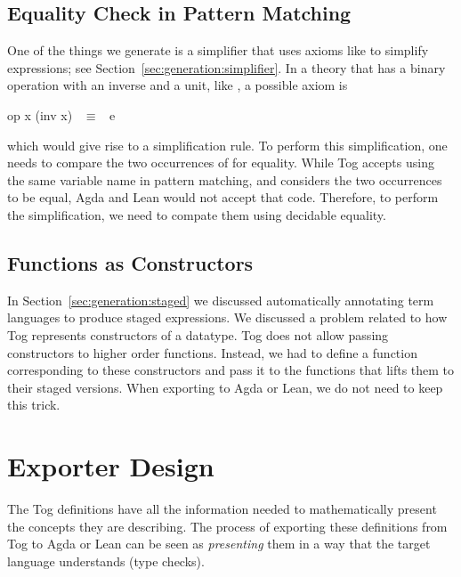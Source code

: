 \subsection{Equality Check in Pattern Matching}
One of the things we generate is a simplifier that uses axioms like  to simplify expressions; see Section~\ref{sec:generation:simplifier}. 
In a theory that has a binary operation with an inverse and a unit, like , a possible axiom is  
\begin{agdacode}
op x (inv x) ~$\equiv$~ e 
\end{agdacode}
\noindent which would give rise to a simplification rule. To perform this simplification, one needs to compare the two occurrences of  for equality. While Tog accepts using the same variable name in pattern matching, and considers the two occurrences to be equal, Agda and Lean would not accept that code. Therefore, to perform the simplification, we need to compate them using decidable equality.

\subsection{Functions as Constructors}
In Section~\ref{sec:generation:staged} we discussed automatically annotating term languages to produce staged expressions. We discussed a problem related to how Tog represents constructors of a datatype. Tog does not allow passing constructors to higher order functions. Instead, we had to define a function corresponding to these constructors and pass it to the functions that lifts them to their staged versions. When exporting to Agda or Lean, we do not need to keep this trick.

\section{Exporter Design}
\label{sec:export_design}
The Tog definitions have all the information needed to mathematically present the concepts they are describing. The process of exporting these definitions from Tog to Agda or Lean can be seen as \emph{presenting} them in a way that the target language understands (type checks).

